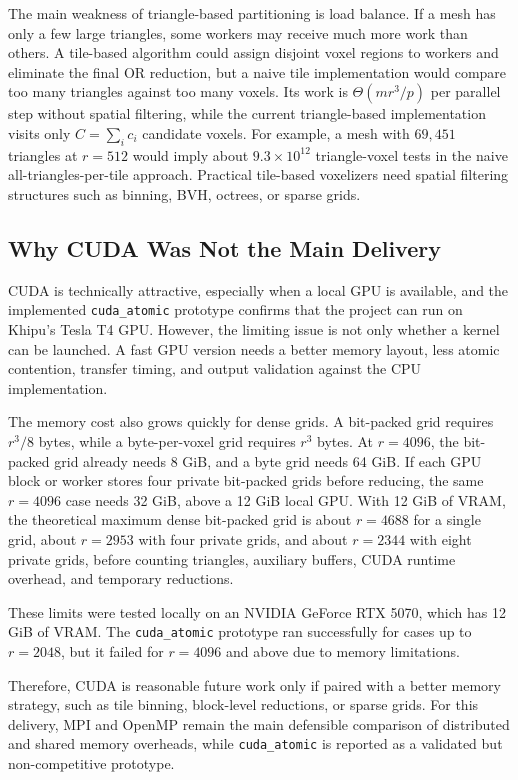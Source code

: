 \documentclass[conference]{IEEEtran}
\begin{document}
The main weakness of triangle-based partitioning is load balance. If a mesh has
only a few large triangles, some workers may receive much more work than
others. A tile-based algorithm could assign disjoint voxel regions to workers
and eliminate the final OR reduction, but a naive tile implementation would
compare too many triangles against too many voxels. Its work is
$\Theta(mr^3/p)$ per parallel step without spatial filtering, while the current
triangle-based implementation visits only $C=\sum_i c_i$ candidate voxels. For
example, a mesh with $69{,}451$ triangles at $r=512$ would imply about
$9.3\times10^{12}$ triangle-voxel tests in the naive all-triangles-per-tile
approach. Practical tile-based voxelizers need spatial filtering structures
such as binning, BVH, octrees, or sparse grids.

\subsection{Why CUDA Was Not the Main Delivery}

CUDA is technically attractive, especially when a local GPU is available, and
the implemented \texttt{cuda\_atomic} prototype confirms that the project can
run on Khipu's Tesla T4 GPU. However, the limiting issue is not only whether a
kernel can be launched. A fast GPU version needs a better memory layout, less
atomic contention, transfer timing, and output validation against the CPU
implementation.

The memory cost also grows quickly for dense grids. A bit-packed grid requires
$r^3/8$ bytes, while a byte-per-voxel grid requires $r^3$ bytes. At $r=4096$,
the bit-packed grid already needs 8 GiB, and a byte grid needs 64 GiB. If each
GPU block or worker stores four private bit-packed grids before reducing, the
same $r=4096$ case needs 32 GiB, above a 12 GiB local GPU. With 12 GiB of VRAM,
the theoretical maximum dense bit-packed grid is about $r=4688$ for a single
grid, about $r=2953$ with four private grids, and about $r=2344$ with eight
private grids, before counting triangles, auxiliary buffers, CUDA runtime
overhead, and temporary reductions.

These limits were tested locally on an NVIDIA GeForce RTX 5070, which has 12 GiB of VRAM. The \texttt{cuda\_atomic} prototype ran successfully for cases up to $r=2048$, but it failed for $r=4096$ and above due to memory limitations.

Therefore, CUDA is reasonable future work only if paired with a better memory
strategy, such as tile binning, block-level reductions, or sparse grids. For
this delivery, MPI and OpenMP remain the main defensible comparison of
distributed and shared memory overheads, while \texttt{cuda\_atomic} is
reported as a validated but non-competitive prototype.
\end{document}
